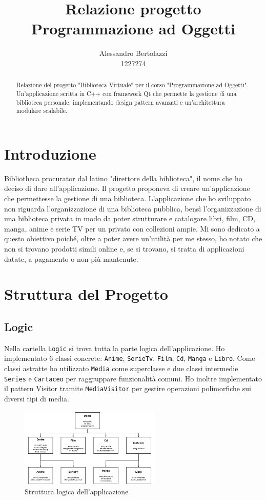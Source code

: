 \documentclass[a4paper,10pt]{article}
\title{Relazione progetto Programmazione ad Oggetti}
\author{Alessandro Bertolazzi \\ 1227274}
\date{}
\begin{document}
\maketitle

\begin{abstract}
\noindent Relazione del progetto "Biblioteca Virtuale" per il corso "Programmazione ad Oggetti". Un'applicazione scritta in C++ con framework Qt che permette la gestione di una biblioteca personale, implementando design pattern avanzati e un'architettura modulare scalabile.
\end{abstract}

\section{Introduzione}
Bibliotheca procurator dal latino "direttore della biblioteca", il nome che ho deciso di dare all'applicazione. Il progetto proponeva di creare un'applicazione che permettesse la gestione di una biblioteca. L'applicazione che ho sviluppato non riguarda l'organizzazione di una biblioteca pubblica, bensì l'organizzazione di una biblioteca privata in modo da poter strutturare e catalogare libri, film, CD, manga, anime e serie TV per un privato con collezioni ampie. Mi sono dedicato a questo obiettivo poiché, oltre a poter avere un'utilità per me stesso, ho notato che non si trovano prodotti simili online e, se si trovano, si tratta di applicazioni datate, a pagamento o non più mantenute.

\section{Struttura del Progetto}
\subsection{Logic}
Nella cartella \texttt{Logic} si trova tutta la parte logica dell'applicazione. Ho implementato 6 classi concrete: \texttt{Anime}, \texttt{SerieTv}, \texttt{Film}, \texttt{Cd}, \texttt{Manga} e \texttt{Libro}. Come classi astratte ho utilizzato \texttt{Media} come superclasse e due classi intermedie \texttt{Series} e \texttt{Cartaceo} per raggruppare funzionalità comuni. Ho inoltre implementato il pattern Visitor tramite \texttt{MediaVisitor} per gestire operazioni polimorfiche sui diversi tipi di media.

\begin{figure}[ht!]
    \centering
    \includegraphics[width=0.6\textwidth]{img/DisegnoSchemaLogico.png}
    \caption{Struttura logica dell'applicazione}
\end{figure}
\end{document}
